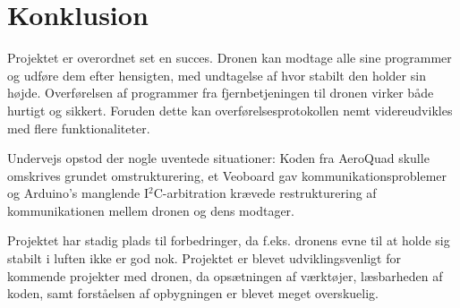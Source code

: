 \documentclass[Main]{subfiles}
\begin{document}
\chapter{Konklusion}

Projektet er overordnet set en succes.
Dronen kan modtage alle sine programmer og udføre dem efter hensigten, med undtagelse af hvor stabilt den holder sin højde.
Overførelsen af programmer fra fjernbetjeningen til dronen virker både hurtigt og sikkert.
Foruden dette kan overførelsesprotokollen nemt videreudvikles med flere funktionaliteter.

Undervejs opstod der nogle uventede situationer: Koden fra AeroQuad skulle omskrives grundet omstrukturering, et Veoboard gav kommunikationsproblemer og Arduino's manglende I$^2$C-arbitration krævede restrukturering af kommunikationen mellem dronen og dens modtager.

Projektet har stadig plads til forbedringer, da f.eks. dronens evne til at holde sig stabilt i luften ikke er god nok.
Projektet er blevet udviklingsvenligt for kommende projekter med dronen, da opsætningen af værktøjer, læsbarheden af koden, samt forståelsen af opbygningen er blevet meget overskuelig.
\end{document}
